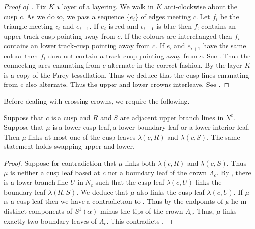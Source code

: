 \documentclass[12pt]{amsart}
\begin{document}
\begin{proof}[Proof of~]
Fix $K$ a layer of a layering.  We walk in $K$ anti-clockwise about the cusp $c$.  As we do so, we pass a sequence $\{e_i\}$ of edges meeting $c$.  Let $f_i$ be the triangle meeting $e_i$ and $e_{i+1}$.  If $e_i$ is red and $e_{i+1}$ is blue then $f_i$ contains an upper track-cusp pointing away from $c$.  If the colours are interchanged then $f_i$ contains an lower track-cusp pointing away from $c$.  If $e_i$ and $e_{i+1}$ have the same colour then $f_i$ does not contain a track-cusp pointing away from $c$.  See .  Thus the connecting arcs emanating from $c$ alternate in the correct fashion.  
By  the layer $K$ is a copy of the Farey tessellation.  Thus we deduce that the cusp lines emanating from $c$ also alternate.  Thus the upper and lower crowns interleave.  See .
\end{proof}

Before dealing with crossing crowns, we require the following.

\begin{lemma}
\label{Lem:TriangleLeafCross}
Suppose that $c$ is a cusp and $R$ and $S$ are adjacent upper branch lines in $N^c$. Suppose that $\mu$ is a lower cusp leaf, a lower boundary leaf or a lower interior leaf. Then $\mu$ links at most one of the cusp leaves $\lambda(c,R)$ and $\lambda(c,S)$.  The same statement holds swapping upper and lower. 
\end{lemma}

\begin{proof}
Suppose for contradiction that $\mu$ links both $\lambda(c,R)$ and $\lambda(c,S)$. Thus $\mu$ is neither a cusp leaf based at $c$ nor a boundary leaf of the crown $\Lambda_c$. By , there is a lower branch line $U$ in $N_c$ such that the cusp leaf $\lambda(c,U)$ links the boundary leaf $\lambda(R,S)$. We deduce that $\mu$ also links the cusp leaf $\lambda(c,U)$. If $\mu$ is a cusp leaf then we have a contradiction to . 
Thus by  the endpoints of $\mu$ lie in distinct components of $S^1(\alpha)$ minus the tips of the crown $\Lambda_c$. Thus, $\mu$ links exactly two boundary leaves of $\Lambda_c$. This contradicts .
\end{proof}
\end{document}
